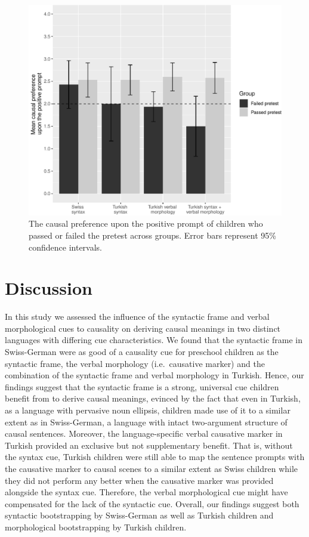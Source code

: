 \documentclass[man]{apa6}
\begin{document}
\begin{figure}[htbp]
\centering
\includegraphics{fig3-1.pdf}
\caption{\label{fig:fig3}The causal preference upon the
positive prompt of children who passed or failed the pretest across
groups. Error bars represent 95\% confidence intervals.}
\end{figure}

\section{Discussion}\label{discussion}

In this study we assessed the influence of the syntactic frame and
verbal morphological cues to causality on deriving causal meanings in
two distinct languages with differing cue characteristics. We found that
the syntactic frame in Swiss-German were as good of a causality cue for
preschool children as the syntactic frame, the verbal morphology
(i.e.~causative marker) and the combination of the syntactic frame and
verbal morphology in Turkish. Hence, our findings suggest that the
syntactic frame is a strong, universal cue children benefit from to
derive causal meanings, evinced by the fact that even in Turkish, as a
language with pervasive noun ellipsis, children made use of it to a
similar extent as in Swiss-German, a language with intact two-argument
structure of causal sentences. Moreover, the language-specific verbal
causative marker in Turkish provided an exclusive but not supplementary
benefit. That is, without the syntax cue, Turkish children were still
able to map the sentence prompts with the causative marker to causal
scenes to a similar extent as Swiss children while they did not perform
any better when the causative marker was provided alongside the syntax
cue. Therefore, the verbal morphological cue might have compensated for
the lack of the syntactic cue. Overall, our findings suggest both
syntactic bootstrapping by Swiss-German as well as Turkish children and
morphological bootstrapping by Turkish children.
\end{document}

